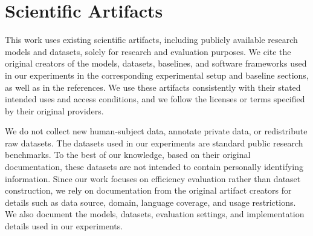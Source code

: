 


\section{Scientific Artifacts}
\label{sec:scientific-artifacts}

This work uses existing scientific artifacts, including publicly available research models and datasets, solely for research and evaluation purposes. We cite the original creators of the models, datasets, baselines, and software frameworks used in our experiments in the corresponding experimental setup and baseline sections, as well as in the references. We use these artifacts consistently with their stated intended uses and access conditions, and we follow the licenses or terms specified by their original providers.

We do not collect new human-subject data, annotate private data, or redistribute raw datasets. The datasets used in our experiments are standard public research benchmarks. To the best of our knowledge, based on their original documentation, these datasets are not intended to contain personally identifying information. Since our work focuses on efficiency evaluation rather than dataset construction, we rely on documentation from the original artifact creators for details such as data source, domain, language coverage, and usage restrictions. We also document the models, datasets, evaluation settings, and implementation details used in our experiments.

